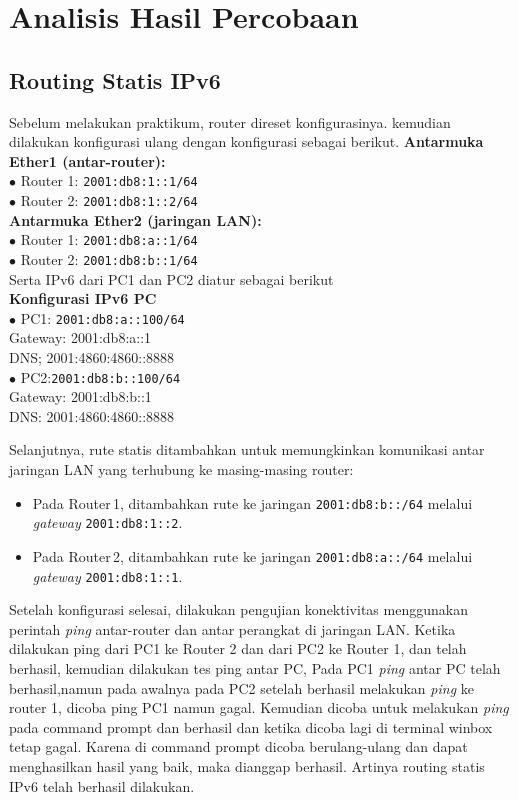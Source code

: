 \section{Analisis Hasil Percobaan}

\subsection{Routing Statis IPv6}
 Sebelum melakukan praktikum, router direset konfigurasinya. kemudian dilakukan konfigurasi ulang dengan konfigurasi sebagai berikut.
	\textbf{Antarmuka Ether1 (antar-router):}\\
		$\bullet$ Router 1: \texttt{2001:db8:1::1/64}\\
		$\bullet$ Router 2: \texttt{2001:db8:1::2/64}\\
	\textbf{Antarmuka Ether2 (jaringan LAN):}\\
		$\bullet$ Router 1: \texttt{2001:db8:a::1/64}\\
		$\bullet$ Router 2: \texttt{2001:db8:b::1/64}\\
Serta IPv6 dari PC1 dan PC2 diatur sebagai berikut\\
\textbf{Konfigurasi IPv6 PC}\\
$\bullet$ PC1: \texttt{2001:db8:a::100/64}\\
Gateway: 2001:db8:a::1\\
DNS; 2001:4860:4860::8888\\ 
$\bullet$ PC2:\texttt{2001:db8:b::100/64}\\
Gateway: 2001:db8:b::1\\
DNS: 2001:4860:4860::8888

Selanjutnya, rute statis ditambahkan untuk memungkinkan komunikasi antar jaringan LAN yang terhubung ke masing-masing router:
\begin{itemize}
	\item Pada Router\,1, ditambahkan rute ke jaringan \texttt{2001:db8:b::/64} melalui \textit{gateway} \texttt{2001:db8:1::2}.
	\item Pada Router\,2, ditambahkan rute ke jaringan \texttt{2001:db8:a::/64} melalui \textit{gateway} \texttt{2001:db8:1::1}.
\end{itemize}

Setelah konfigurasi selesai, dilakukan pengujian konektivitas menggunakan perintah \textit{ping} antar-router dan antar perangkat di jaringan LAN. Ketika dilakukan ping dari PC1 ke Router 2 dan dari PC2 ke Router 1, dan telah berhasil, kemudian dilakukan tes ping antar PC, Pada PC1 \textit{ping} antar PC telah berhasil,namun pada awalnya pada PC2 setelah berhasil melakukan \textit{ping} ke router 1, dicoba ping PC1 namun gagal. Kemudian dicoba untuk melakukan \textit{ping} pada command prompt dan berhasil dan ketika dicoba lagi di terminal winbox tetap gagal. Karena di command prompt dicoba berulang-ulang dan dapat menghasilkan hasil yang baik, maka dianggap berhasil. Artinya routing statis IPv6 telah berhasil dilakukan.


